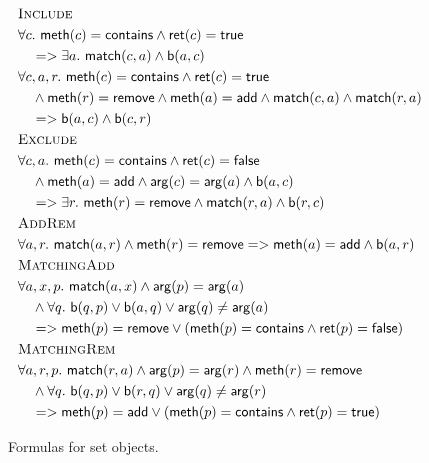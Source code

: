 \begin{figure}
  \footnotesize
  \begin{align*}
    & \textsc{Include} \\
    & \forall c.\ {\sf meth}(c) = {\sf contains} \land {\sf ret}(c) = {\sf true} \\
    & \quad => \exists a.\ {\sf match}(c,a) \land {\sf b}(a,c) \\
    & \forall c,a,r.\ {\sf meth}(c)={\sf contains} \land {\sf ret}(c) = {\sf true} \\
    & \quad \land {\sf meth}(r) = {\sf remove}\land {\sf meth}(a) = {\sf add} \land  {\sf match}(c,a) \land {\sf match}(r,a)  \\ %
    & \quad => {\sf b}(a,c) \land {\sf b}(c,r)
    \\
    & \textsc{Exclude} \\
    & \forall c,a.\ {\sf meth}(c)={\sf contains} \land {\sf ret}(c) = {\sf false} \\
    & \quad \land {\sf meth}(a) = {\sf add}\land {\sf arg}(c) = {\sf arg}(a) \land {\sf b}(a,c) \\
    & \quad => \exists r.\ {\sf meth}(r)={\sf remove} \land {\sf match}(r,a) \land {\sf b}(r,c)
    \\
    & \textsc{AddRem} \\
    & \forall a,r.\ {\sf match}(a,r) \land {\sf meth}(r) = {\sf remove}  => {\sf meth}(a)={\sf add} \land {\sf b}(a,r) 
    \\
    & \textsc{MatchingAdd} \\
    & \forall a,x,p.\ {\sf match}(a,x) \land {\sf arg}(p) = {\sf arg}(a) \\
    & \quad \land \forall q.\ {\sf b}(q,p) \vee {\sf b}(a,q) \vee {\sf arg}(q)\neq {\sf arg}(a) \\
    & \quad => {\sf meth}(p)={\sf remove} \vee ({\sf meth}(p)={\sf contains} \land {\sf ret}(p) = {\sf false}) 
    \\
    & \textsc{MatchingRem} \\
    & \forall a,r,p.\ {\sf match}(r,a) \land {\sf arg}(p) = {\sf arg}(r) \land {\sf meth}(r)={\sf remove}\\
    & \quad \land \forall q.\ {\sf b}(q,p) \vee {\sf b}(r,q) \vee {\sf arg}(q)\neq {\sf arg}(r) \\
    & \quad => {\sf meth}(p)={\sf add} \vee ({\sf meth}(p)={\sf contains} \land {\sf ret}(p) = {\sf true}) 
  \end{align*}
  \caption{Formulas for set objects.}
  \label{fig:formulas:set}
\end{figure}

